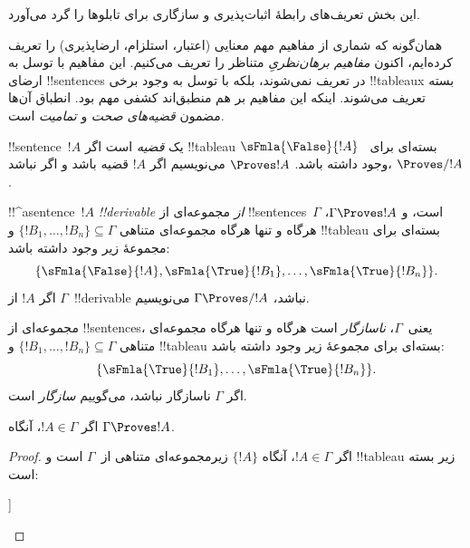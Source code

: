 \documentclass[../../../include/open-logic-section]{subfiles}
\begin{document}
      {}
      {}


\begin{editorial}
این بخش تعریف‌های رابطهٔ اثبات‌پذیری و سازگاری برای تابلوها را گرد
می‌آورد.
\end{editorial}

\begin{explain}
همان‌گونه که شماری از مفاهیم مهم معنایی (اعتبار، استلزام، ارضاپذیری) را
تعریف کرده‌ایم، اکنون \emph{مفاهیم برهان‌نظریِ} متناظر را تعریف می‌کنیم.
این مفاهیم با توسل به ارضای !!{sentence}s در
 تعریف نمی‌شوند، بلکه با توسل
به وجود برخی !!{tableau}x بسته تعریف می‌شوند. اینکه این مفاهیم بر هم
منطبق‌اند کشفی مهم بود. انطباق آن‌ها مضمون \emph{قضیه‌های صحت} و
\emph{تمامیت} است.
\end{explain}


\begin{defn}[قضیه‌ها]
!!{sentence}~$!A$ یک \emph{قضیه} است اگر !!{tableau} بسته‌ای برای
~$\sFmla{\False}{!A}$ وجود داشته باشد. $\Proves !A$ می‌نویسیم اگر
$!A$ قضیه باشد و اگر نباشد، $\Proves/ !A$.
\end{defn}

\begin{defn}[!!^{derivability}]
!!^a{sentence}~$!A$ \emph{!!{derivable} از} مجموعه‌ای از
!!{sentence}s~$\Gamma$ است، و $\Gamma \Proves !A$، هرگاه و تنها هرگاه
مجموعه‌ای متناهی $\{!B_1, \dots, !B_n\} \subseteq \Gamma$ و
!!{tableau} بسته‌ای برای مجموعهٔ زیر وجود داشته باشد:
\[
\{
  \sFmla{\False}{!A},
  \sFmla{\True}{!B_1}, \dots,
  \sFmla{\True}{!B_n}
  \}.
\]
اگر $!A$ از $\Gamma$~!!{derivable} نباشد، $\Gamma \Proves/
!A$ می‌نویسیم.
\end{defn}

\begin{defn}[سازگاری]
مجموعه‌ای از !!{sentence}s، یعنی~$\Gamma$، \emph{ناسازگار} است هرگاه و تنها
هرگاه مجموعه‌ای متناهی $\{!B_1, \dots, !B_n\} \subseteq \Gamma$ و
!!{tableau} بسته‌ای برای مجموعهٔ زیر وجود داشته باشد:
\[
\{
  \sFmla{\True}{!B_1}, \dots,
  \sFmla{\True}{!B_n}
  \}.
\]
اگر $\Gamma$ ناسازگار نباشد، می‌گوییم \emph{سازگار} است.
\end{defn}

\begin{prop}
اگر $!A \in \Gamma$، آنگاه $\Gamma \Proves !A$.
\end{prop}

\begin{proof}
اگر $!A \in \Gamma$، آنگاه $\{!A\}$ زیرمجموعه‌ای متناهی از~$\Gamma$ است
و !!{tableau} زیر بسته است:
\begin{oltableau}
  [\sFmla{\False}{\formula{A}}, just = \TAss
    [\sFmla{\True}{\formula{A}}, just = \TAss,close]
  ]
\end{oltableau}
\end{proof}
\end{document}
